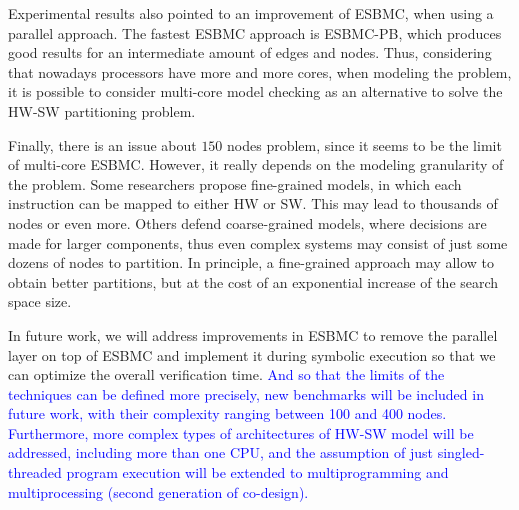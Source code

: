 \documentclass{doublecol-new}
\theoremstyle{TH}{
\newtheorem{lemma}{Lemma}
\newtheorem{theorem}[lemma]{Theorem}
\newtheorem{corrolary}[lemma]{Corrolary}
\newtheorem{conjecture}[lemma]{Conjecture}
\newtheorem{proposition}[lemma]{Proposition}
\newtheorem{claim}[lemma]{Claim}
\newtheorem{stheorem}[lemma]{Wrong Theorem}
\newtheorem{algorithm}{Algorithm}
}
\theoremstyle{THrm}{
\newtheorem{definition}{Definition}[section]
\newtheorem{question}{Question}[section]
\newtheorem{remark}{Remark}
\newtheorem{scheme}{Scheme}
}
\theoremstyle{THhit}{
\newtheorem{case}{Case}[section]
}
\begin{document}
Experimental results also pointed to an improvement of ESBMC, when using a parallel approach. The fastest ESBMC approach is ESBMC-PB, which produces good results for an intermediate amount of edges and nodes. Thus, considering that nowadays processors have more and more cores, when modeling the problem, it is possible to consider multi-core model checking as an alternative to solve the HW-SW partitioning problem. 

Finally, there is an issue about $150$ nodes problem, since it seems to be the limit of multi-core ESBMC. However, it really depends on the modeling granularity of the problem. Some researchers propose fine-grained models, in which each instruction can be mapped to either HW or SW. This may lead to thousands of nodes or even more. Others defend coarse-grained models, where decisions are made for larger components, thus even complex systems may consist of just some dozens of nodes to partition. In principle, a fine-grained approach may allow to obtain better partitions, but at the cost of an exponential increase of the search space size. 

In future work, we will address improvements in ESBMC to remove the parallel layer on top of ESBMC and implement it during symbolic execution so that we can optimize the overall verification time. \textcolor{blue}{And so that the limits of the techniques can be defined more precisely, new benchmarks will be included in future work, with their complexity ranging between 100 and 400 nodes. Furthermore, more complex types of architectures of HW-SW model will be addressed, including more than one CPU, and the assumption of just singled-threaded program execution will be extended to multiprogramming and multiprocessing (second generation of co-design).}
\end{document}

